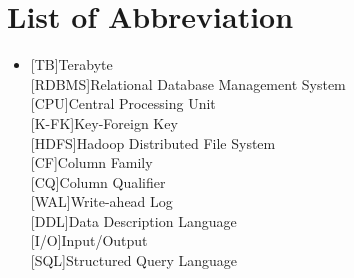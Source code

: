 







\chapter*{List of Abbreviation}
\label{acronyms}
\begin{itemize}

\item[]
\begin{acronym}[Symbols]
	\acro{}[TB]{Terabyte}\\
	\acro{}[RDBMS]{Relational Database Management System}\\
	\acro{}[CPU]{Central Processing Unit}\\
	\acro{}[K-FK]{Key-Foreign Key}\\
	\acro{}[HDFS]{Hadoop Distributed File System}\\
	\acro{}[CF]{Column Family}\\
	\acro{}[CQ]{Column Qualifier}\\
	\acro{}[WAL]{Write-ahead Log}\\
	\acro{}[DDL]{Data Description Language}\\
	\acro{}[I/O]{Input/Output}\\
	\acro{}[SQL]{Structured Query Language}\\
	
\end{acronym}
\end{itemize}

    
	


